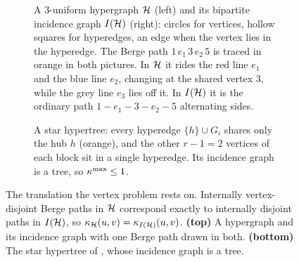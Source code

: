 \begin{figure}[htbp]
\begin{subfigure}[b]{0.99\textwidth}
\caption{A $3$-uniform hypergraph $\mathcal{H}$ (left) and its bipartite incidence
graph $I(\mathcal{H})$ (right): circles for vertices, hollow squares for hyperedges,
an edge when the vertex lies in the hyperedge. The Berge path
$1\,e_1\,3\,e_2\,5$ is traced in orange in both pictures. In $\mathcal{H}$ it rides the
red line $e_1$ and the blue line $e_2$, changing at the shared vertex $3$, while
the grey line $e_3$ lies off it. In $I(\mathcal{H})$ it is the ordinary path
$1\!-\!e_1\!-\!3\!-\!e_2\!-\!5$ alternating sides.}
\label{fig:incidence-berge}
\end{subfigure}

\medskip
\begin{subfigure}[b]{0.99\textwidth}
\centering
{}
\caption{A star hypertree: every hyperedge $\{h\}\cup G_i$ shares only the
hub $h$ (orange), and the other $r-1=2$ vertices of each block sit in a
single hyperedge. Its incidence graph is a tree, so $\kappa^{\max}\le1$.}
\label{fig:star-hypertree}
\end{subfigure}
\caption[Incidence translation]{The translation the vertex problem rests on.
Internally vertex-disjoint Berge paths in $\mathcal{H}$ correspond exactly to
internally disjoint paths in $I(\mathcal{H})$, so $\kappa_{\mathcal{H}}(u,v)=\kappa_{I(\mathcal{H})}(u,v)$.
\textbf{(top)} A hypergraph and its incidence graph with one Berge path
drawn in both. \textbf{(bottom)} The star hypertree of
, whose incidence graph is a tree.}
\label{fig:incidence}
\end{figure}

